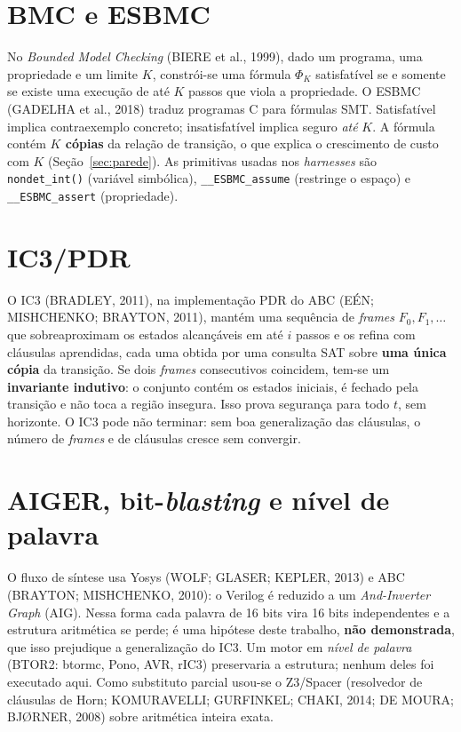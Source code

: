 \documentclass[12pt,openright,oneside,a4paper,chapter=TITLE,sumario=tradicional,english,brazil]{abntex2}
\begin{document}
\section{BMC e ESBMC}

No \emph{Bounded Model Checking} (BIERE et al., 1999), dado um programa, uma propriedade e um limite $K$, constrói-se uma fórmula $\Phi_K$ satisfatível se e somente se existe uma execução de até $K$ passos que viola a propriedade. O ESBMC (GADELHA et al., 2018) traduz programas C para fórmulas SMT. Satisfatível implica contraexemplo concreto; insatisfatível implica seguro \emph{até} $K$. A fórmula contém \textbf{$K$ cópias} da relação de transição, o que explica o crescimento de custo com $K$ (Seção~\ref{sec:parede}). As primitivas usadas nos \emph{harnesses} são \texttt{nondet\_int()} (variável simbólica), \texttt{\_\_ESBMC\_assume} (restringe o espaço) e \texttt{\_\_ESBMC\_assert} (propriedade).

\section{IC3/PDR}

O IC3 (BRADLEY, 2011), na implementação PDR do ABC (EÉN; MISHCHENKO; BRAYTON, 2011), mantém uma sequência de \emph{frames} $F_0,F_1,\dots$ que sobreaproximam os estados alcançáveis em até $i$ passos e os refina com cláusulas aprendidas, cada uma obtida por uma consulta SAT sobre \textbf{uma única cópia} da transição. Se dois \emph{frames} consecutivos coincidem, tem-se um \textbf{invariante indutivo}: o conjunto contém os estados iniciais, é fechado pela transição e não toca a região insegura. Isso prova segurança para todo $t$, sem horizonte. O IC3 pode não terminar: sem boa generalização das cláusulas, o número de \emph{frames} e de cláusulas cresce sem convergir.

\section{AIGER, bit-\emph{blasting} e nível de palavra}

O fluxo de síntese usa Yosys (WOLF; GLASER; KEPLER, 2013) e ABC (BRAYTON; MISHCHENKO, 2010): o Verilog é reduzido a um \emph{And-Inverter Graph} (AIG). Nessa forma cada palavra de 16 bits vira 16 bits independentes e a estrutura aritmética se perde; é uma hipótese deste trabalho, \textbf{não demonstrada}, que isso prejudique a generalização do IC3. Um motor em \emph{nível de palavra} (BTOR2: btormc, Pono, AVR, rIC3) preservaria a estrutura; nenhum deles foi executado aqui. Como substituto parcial usou-se o Z3/Spacer (resolvedor de cláusulas de Horn; KOMURAVELLI; GURFINKEL; CHAKI, 2014; DE MOURA; BJØRNER, 2008) sobre aritmética inteira exata.
\end{document}
